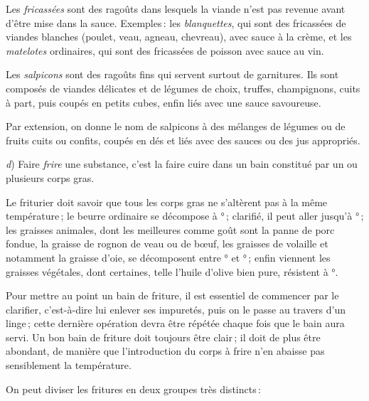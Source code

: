 Les \textit{fricassées} sont des ragoûts dans lesquels la viande n'est pas
revenue avant d'être mise dans la sauce. Exemples : les \textit{blanquettes},
qui sont des fricassées de viandes blanches (poulet, veau, agneau, chevreau),
avec sauce à la crème, et les \textit{matelotes} ordinaires, qui sont des
fricassées de poisson avec sauce au vin.

Les \textit{salpicons} sont des ragoûts fins qui servent surtout de garnitures.
Ils sont composés de viandes délicates et de légumes de choix, truffes,
champignons, cuits à part, puis coupés en petits cubes, enfin liés avec une
sauce savoureuse.

Par extension, on donne le nom de salpicons à des mélanges de légumes ou de
fruits cuits ou confits, coupés en dés et liés avec des sauces ou des jus
appropriés.

\textit{d}) Faire \textit{frire} une substance, c'est la faire cuire dans un
bain constitué par un ou plusieurs corps gras.


Le friturier doit savoir que tous les corps gras ne s'altèrent pas à la même
température ; le beurre ordinaire se décompose à {\mmm}° ; clarifié, il
peut aller jusqu'à {\mmm}° ; les graisses animales, dont les meilleures
comme goût sont la panne de porc fondue, la graisse de rognon de veau ou de
bœuf, les graisses de volaille et notamment la graisse d'oie, se décomposent
entre {\mmm}° et {\mmm}° ; enfin viennent les graisses végétales,
dont certaines, telle l'huile d'olive bien pure, résistent à {\mmm}°.

Pour mettre au point un bain de friture, il est essentiel de commencer par le
clarifier, c'est-à-dire lui enlever ses impuretés, puis on le passe au travers
d'un linge ; cette dernière opération devra être répétée chaque fois que le
bain aura servi. Un bon bain de friture doit toujours être clair ; il doit de
plus être abondant, de manière que l'introduction du corps à frire n'en abaisse
pas sensiblement la température.

On peut diviser les fritures en deux groupes très distincts :

